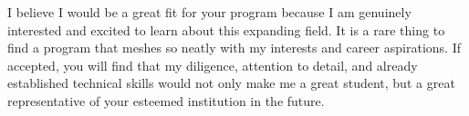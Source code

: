 \documentclass[12pt, a4paper]{awesome-cv}
\begin{document}
\begin{cvletter}
I believe I would be a great fit for your program because I am genuinely interested and excited to learn about this expanding field. It is a rare thing to find a program that meshes so neatly with my interests and career aspirations. If accepted, you will find that my diligence, attention to detail, and already established technical skills would not only make me a great student, but a great representative of your esteemed institution in the future.


\end{cvletter}

\end{document}
